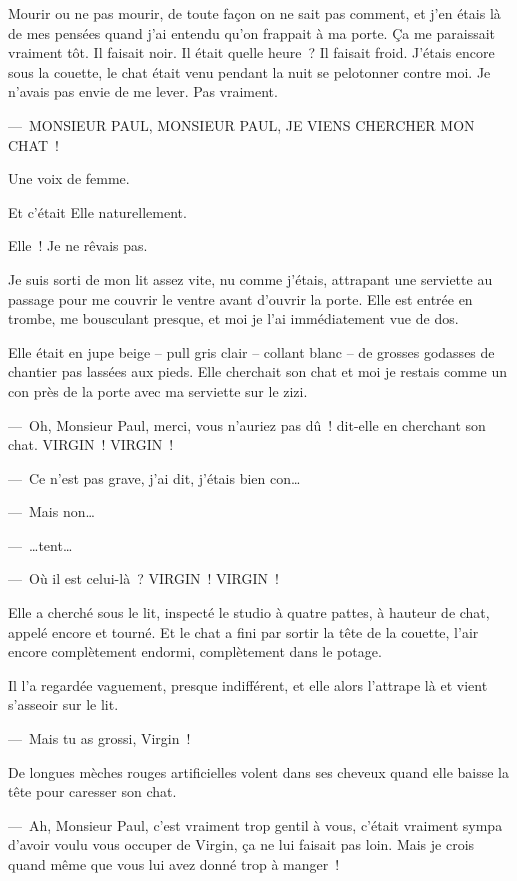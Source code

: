 \documentclass[french,twoside]{book} %
\begin{document}
\noindent Mourir ou ne pas mourir, de toute façon on ne sait pas comment, et j’en étais là de mes pensées quand j’ai entendu qu’on frappait à ma porte. Ça me paraissait vraiment tôt. Il faisait noir. Il était quelle heure ? Il faisait froid. J’étais encore sous la couette, le chat était venu pendant la nuit se pelotonner contre moi. Je n’avais pas envie de me lever. Pas vraiment.\par
— MONSIEUR PAUL, MONSIEUR PAUL, JE VIENS CHERCHER MON CHAT !\par
Une voix de femme.\par
Et c’était Elle naturellement.\par
Elle ! Je ne rêvais pas.\par
Je suis sorti de mon lit assez vite, nu comme j’étais, attrapant une serviette au passage pour me couvrir le ventre avant d’ouvrir la porte. Elle est entrée en trombe, me bousculant presque, et moi je l’ai immédiatement vue de dos.\par
Elle était en jupe beige – pull gris clair – collant blanc – de grosses godasses de chantier pas lassées aux pieds. Elle cherchait son chat et moi je restais comme un con près de la porte avec ma serviette sur le zizi.\par
— Oh, Monsieur Paul, merci, vous n’auriez pas dû ! dit-elle en cherchant son chat. VIRGIN ! VIRGIN !\par
— Ce n’est pas grave, j’ai dit, j’étais bien con…\par
— Mais non…\par
— …tent…\par
— Où il est celui-là ? VIRGIN ! VIRGIN !\par
Elle a cherché sous le lit, inspecté le studio à quatre pattes, à hauteur de chat, appelé encore et tourné. Et le chat a fini par sortir la tête de la couette, l’air encore complètement endormi, complètement dans le potage.\par
Il l’a regardée vaguement, presque indifférent, et elle alors l’attrape là et vient s’asseoir sur le lit.\par
— Mais tu as grossi, Virgin !\par
De longues mèches rouges artificielles volent dans ses cheveux quand elle baisse la tête pour caresser son chat.\par
— Ah, Monsieur Paul, c’est vraiment trop gentil à vous, c’était vraiment sympa d’avoir voulu vous occuper de Virgin, ça ne lui faisait pas loin. Mais je crois quand même que vous lui avez donné trop à manger !\par
\end{document}
